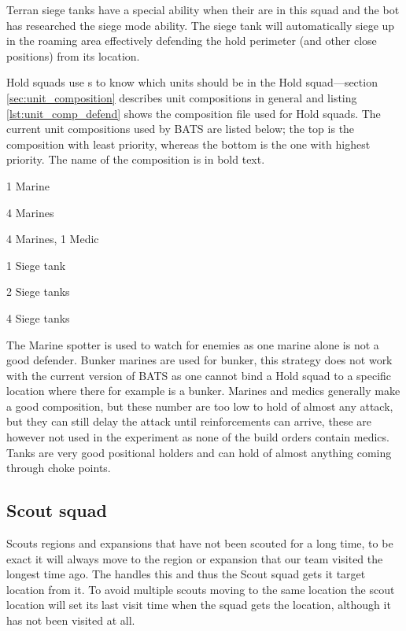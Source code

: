 Terran siege tanks have a special ability when their are in this squad and the bot has researched
the siege mode ability. The siege tank will automatically siege up in the roaming area effectively
defending the hold perimeter (and other close positions) from its location.

Hold squads use s to know which units should be in the Hold
squad—section \ref{sec:unit_composition} describes unit compositions in general and listing
\ref{lst:unit_comp_defend} shows the composition file used for Hold squads. The current unit
compositions used by BATS are listed below; the top is the composition with least priority, whereas
the bottom is the one with highest priority. The name of the composition is in bold text.

\begin{function_description}
	\item[Marine spotter] 1 Marine
	\item[Bunker Marines] 4 Marines
	\item[Marine Medics] 4 Marines, 1 Medic
	\item[Tanks 1] 1 Siege tank
	\item[Tanks 2] 2 Siege tanks
	\item[Tanks 4] 4 Siege tanks
\end{function_description}
The Marine spotter is used to watch for enemies as one marine alone is not a good defender. Bunker
marines are used for bunker, this strategy does not work with the current version of BATS as one
cannot bind a Hold squad to a specific location where there for example is a bunker. Marines and
medics generally make a good composition, but these number are too low to hold of almost any attack,
but they can still delay the attack until reinforcements can arrive, these are however not used in
the experiment as none of the build orders contain medics. Tanks are very good positional holders and
can hold of almost anything coming through choke points\cite{day9}.

\subsection{Scout squad}
\label{sec:scout_squad}
Scouts regions and expansions that have not been scouted for a long time, to be exact it will always
move to the region or expansion that our team visited the longest time ago. The
 handles this and thus the Scout squad gets it target location from
it. To avoid multiple scouts moving to the same location the scout location will set its last visit
time when the squad gets the location, although it has not been visited at all.

